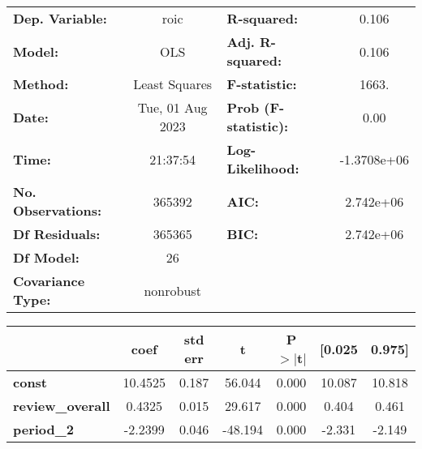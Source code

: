 \begin{center}
\begin{tabular}{lclc}
\toprule
\textbf{Dep. Variable:}                                               &       roic       & \textbf{  R-squared:         } &      0.106   \\
\textbf{Model:}                                                       &       OLS        & \textbf{  Adj. R-squared:    } &      0.106   \\
\textbf{Method:}                                                      &  Least Squares   & \textbf{  F-statistic:       } &      1663.   \\
\textbf{Date:}                                                        & Tue, 01 Aug 2023 & \textbf{  Prob (F-statistic):} &      0.00    \\
\textbf{Time:}                                                        &     21:37:54     & \textbf{  Log-Likelihood:    } & -1.3708e+06  \\
\textbf{No. Observations:}                                            &      365392      & \textbf{  AIC:               } &  2.742e+06   \\
\textbf{Df Residuals:}                                                &      365365      & \textbf{  BIC:               } &  2.742e+06   \\
\textbf{Df Model:}                                                    &          26      & \textbf{                     } &              \\
\textbf{Covariance Type:}                                             &    nonrobust     & \textbf{                     } &              \\
\bottomrule
\end{tabular}
\begin{tabular}{lcccccc}
                                                                      & \textbf{coef} & \textbf{std err} & \textbf{t} & \textbf{P$> |$t$|$} & \textbf{[0.025} & \textbf{0.975]}  \\
\midrule
\textbf{const}                                                        &      10.4525  &        0.187     &    56.044  &         0.000        &       10.087    &       10.818     \\
\textbf{review\_overall}                                              &       0.4325  &        0.015     &    29.617  &         0.000        &        0.404    &        0.461     \\
\textbf{period\_2}                                                    &      -2.2399  &        0.046     &   -48.194  &         0.000        &       -2.331    &       -2.149     \\

\end{tabular}
\end{center}
